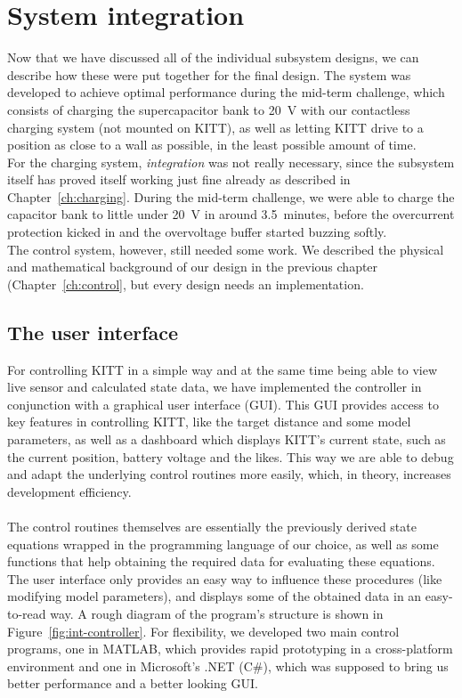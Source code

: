 \documentclass[11pt,titlepage]{report}
\begin{document}
\chapter{System integration}
\label{ch:integration}
Now that we have discussed all of the individual subsystem designs, we can describe how these were put together for the final design. The system was developed to achieve optimal performance during the mid-term challenge, which consists of charging the supercapacitor bank to \SI{20}{V} with our contactless charging system (not mounted on KITT), as well as letting KITT drive to a position as close to a wall as possible, in the least possible amount of time. \\
For the charging system, \textit{integration} was not really necessary, since the subsystem itself has proved itself working just fine already as described in Chapter~\ref{ch:charging}. During the mid-term challenge, we were able to charge the capacitor bank to little under \SI{20}{V} in around \SI{3.5}{minutes}, before the overcurrent protection kicked in and the overvoltage buffer started buzzing softly.
\\
The control system, however, still needed some work. We described the physical and mathematical background of our design in the previous chapter (Chapter~\ref{ch:control}, but every design needs an implementation.

\section{The user interface}
For controlling KITT in a simple way and at the same time being able to view live sensor and calculated state data, we have implemented the controller in conjunction with a graphical user interface (GUI). This GUI provides access to key features in controlling KITT, like the target distance and some model parameters, as well as a dashboard which displays KITT's current state, such as the current position, battery voltage and the likes. This way we are able to debug and adapt the underlying control routines more easily, which, in theory, increases development efficiency.
\\\\
The control routines themselves are essentially the previously derived state equations wrapped in the programming language of our choice, as well as some functions that help obtaining the required data for evaluating these equations. The user interface only provides an easy way to influence these procedures (like modifying model parameters), and displays some of the obtained data in an easy-to-read way. A rough diagram of the program's structure is shown in Figure~\ref{fig:int-controller}. For flexibility, we developed two main control programs, one in MATLAB, which provides rapid prototyping in a cross-platform environment and one in Microsoft's .NET (C\#), which was supposed to bring us better performance and a better looking GUI.
\end{document}

